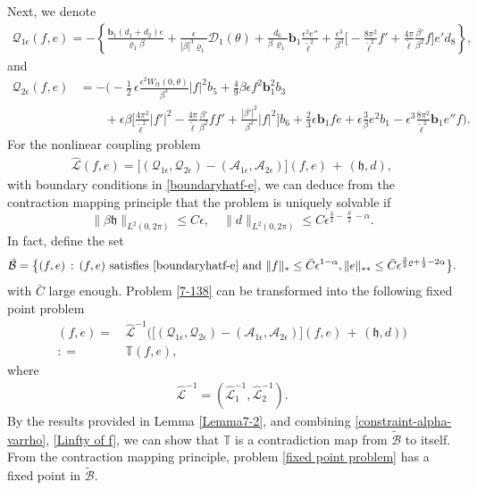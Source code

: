 \documentclass[10pt, reqno]{amsart}
\numberwithin{equation}{section}
\theoremstyle{definition}
\begin{document}
{\medskip
Next, we denote
\begin{align*}
 \mathcal Q_{1\epsilon} (f, e)
=  -\left\{ \frac {{\mathbf b}_1(d_1+d_2)e}{\varrho_1\beta}
+\frac{\epsilon}{|\beta|^3 \varrho_1}{\mathcal D}_1(\theta)
+ \frac{d_6} {\beta\, \varrho_1}{\mathbf b}_1 \frac{\epsilon^2 e''}{\tilde\ell^2}
+ \frac{\epsilon^3}{\beta^3}\Big[ -\frac{8\pi^2}{{\tilde\ell}^2}f' +\frac{4\pi}{ {\tilde\ell}}\frac{\beta'}{\beta^2} f\Big]e'd_8 \right\},
\end{align*}
and
\begin{align*}
\mathcal Q_{2\epsilon} (f, e)
& = - \Bigg(-\frac{1}{2}\, \epsilon \frac{ \epsilon^2W_{tt}(0, \theta)}{\beta^3}|f|^2 b_5
+\frac{4}{9} \beta\epsilon f^2 {\mathbf b}_1^2 b_3
\nonumber\\[2mm]
 & \qquad +\epsilon\beta\Big[\frac{4\pi^2}{{\tilde\ell}^2}|f'|^2
-\frac{4\pi}{{\tilde\ell}}\frac{\beta'}{\beta^2}ff'
+\frac{|\beta'|^2}{\beta^4} |f|^2
\Big] b_6
 +\frac 23\epsilon {\mathbf b}_1 fe + \epsilon \frac3{\beta}e^2b_1
 - \epsilon^3 \frac{8\pi^2} {{\tilde\ell}^2} {\mathbf b}_1 e'' f \Bigg).
\end{align*}
For the nonlinear coupling problem
\begin{align} \label{7-138}
 \hat {\mathcal L} (f, e) = \Big[\left(\mathcal Q_{1\epsilon}, \mathcal Q_{2\epsilon}\right) - \left(\mathcal A_{1\epsilon}, \mathcal A_{2\epsilon} \right) \Big](f, e)
\,+\, \left({\mathfrak h}, d\right),
\end{align}
with boundary conditions in \eqref{boundaryhatf-e},
we can deduce from the contraction mapping principle that the problem is uniquely solvable if
$$
\|\beta {\mathfrak h}\|_{L^2(0, 2\pi)} \le {C} \epsilon, \quad \|d\|_{L^2(0, 2\pi)} \le C \epsilon^{\frac32-\frac\varrho 2- \alpha}.
$$
In fact, define the set
\[
\tilde{\mathcal B} = \big\{ (f, e)\,:\, (f, e)~\text{satisfies} ~\eqref{boundaryhatf-e}~\text{and}~\|f\|_* \le \bar{C} \epsilon^{1-\alpha}, \|e\|_{**} \le \bar{C} \epsilon^{\frac 32 \varrho+ \frac12-2\alpha} \big\}.
\]
with $\bar C$ large enough.
Problem \eqref{7-138} can be transformed into the following fixed point problem
\begin{align} \label{fixed point problem}
 (f,e) =\, & \hat {\mathcal L}^{-1}\Bigg( \Big[ \left(\mathcal Q_{1\epsilon}, \mathcal Q_{2\epsilon}\right) - \left(\mathcal A_{1\epsilon}, \mathcal A_{2\epsilon}\right) \Big] (f, e)
 \,+\,
 \left({\mathfrak h}, d\right)\Bigg)
\nonumber\\[2mm]
: = \, & \mathbb{T} (f, e),
\end{align}
where
\begin{align*}
\hat {\mathcal L}^{-1} = \left( \hat {\mathcal L}_1^{-1}, \hat {\mathcal L}_2^{-1}\right).
\end{align*}
 By the results provided in Lemma \ref{Lemma7-2}, and combining \eqref{constraint-alpha-varrho}, \eqref{Linfty of f},  we can show that
$\mathbb{T} $ is a contradiction map from $\tilde{\mathcal B}$ to itself. From the contraction mapping principle, problem \eqref{fixed point problem} has a fixed point in $\tilde{\mathcal B}$.

}
\end{document}
